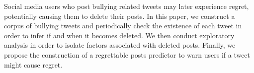 Social media users who post bullying related tweets may later experience regret, potentially causing them to delete their posts. In this paper, we
 construct a corpus of bullying tweets and periodically check the existence of
 each tweet in order to infer if and when it becomes deleted. We then conduct
 exploratory analysis in order to isolate factors associated with deleted posts.
 Finally, we propose the construction of a regrettable posts predictor to warn
 users if a tweet might cause regret.

